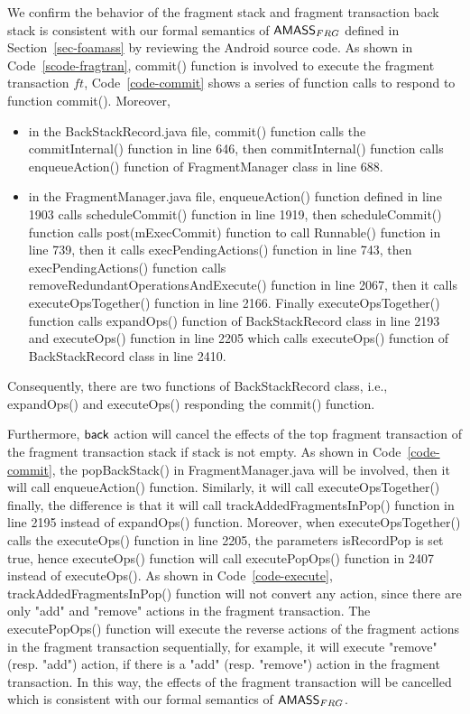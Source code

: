 {We confirm the behavior of the fragment stack and fragment transaction back stack is consistent with our formal semantics of $\textsf{AMASS}_{FRG}$ defined in Section~\ref{sec-foamass} by reviewing the Android source code. As shown in Code~\ref{scode-fragtran}, commit() function is involved to execute the fragment transaction $ft$, Code~\ref{code-commit} shows a series of function calls to respond to function commit(). Moreover,
\begin{itemize}
    \item in the BackStackRecord.java file, commit() function calls the commitInternal() function in line 646, then commitInternal() function calls enqueueAction() function of FragmentManager class in line 688.
    \item in the FragmentManager.java file, enqueueAction() function defined in line 1903 calls scheduleCommit() function in line 1919, then scheduleCommit() function calls post(mExecCommit) function to call Runnable() function in line 739, then it calls execPendingActions() function in line 743, then execPendingActions() function calls removeRedundantOperationsAndExecute() function in line 2067, then it calls executeOpsTogether() function in line 2166. Finally executeOpsTogether() function calls expandOps()  function of BackStackRecord class in line 2193 and executeOps() function in line 2205 which calls executeOps() function of BackStackRecord class in line 2410.
\end{itemize}
Consequently, there are two functions of BackStackRecord class, i.e., expandOps() and executeOps() responding the commit() function.

Furthermore, ${\mathsf{back} }$ action will cancel the effects of the top fragment transaction of the fragment transaction stack if stack is not empty. As shown in Code~\ref{code-commit}, the popBackStack() in FragmentManager.java will be involved, then it will call enqueueAction() function. Similarly, it will call executeOpsTogether() finally, the difference is that it will call trackAddedFragmentsInPop() function in line 2195 instead of expandOps() function. Moreover, when executeOpsTogether() calls the executeOps() function in line 2205, the parameters isRecordPop is set true, hence executeOps() function will call executePopOps() function in 2407 instead of executeOps(). As shown in Code~\ref{code-execute}, trackAddedFragmentsInPop() function will not convert any action, since there are only "add" and "remove" actions in the fragment transaction. The executePopOps() function will execute the reverse actions of the fragment actions in the fragment transaction sequentially, for example, it will execute "remove" (resp. "add") action, if there is a "add" (resp. "remove") action in the fragment transaction. In this way, the effects of the fragment transaction will be cancelled which is consistent with our formal semantics of $\textsf{AMASS}_{FRG}$.

}
